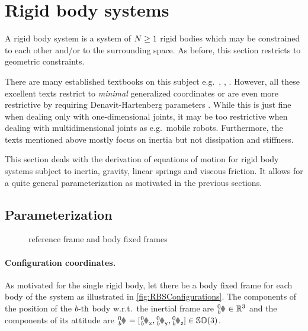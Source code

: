 \section{Rigid body systems}\label{sec:RBSRigidBodySys}
A rigid body system is a system of $N \geq 1$ rigid bodies which may be constrained to each other and/or to the surrounding space.
As before, this section restricts to geometric constraints.

There are many established textbooks on this subject e.g.\ \cite{Schwertassek:MultibodySystems}, \cite{Murray:Robotic}, \cite{Kane:Dynamics}.
However, all these excellent texts restrict to \textit{minimal} generalized coordinates or are even more restrictive by requiring Denavit-Hartenberg parameters \cite{DenavitHartenbergParam}.
While this is just fine when dealing only with one-dimensional joints, it may be too restrictive when dealing with multidimensional joints as e.g.\ mobile robots.
Furthermore, the texts mentioned above mostly focus on inertia but not dissipation and stiffness.

This section deals with the derivation of equations of motion for rigid body systems subject to inertia, gravity, linear springs and viscous friction.
It allows for a quite general parameterization as motivated in the previous sections.

\subsection{Parameterization}\label{sec:RBSParameterization}
\begin{figure}[ht]
 \centering
 
 \caption{reference frame and body fixed frames}
 \label{fig:RBSConfigurations}
\end{figure}

\paragraph{Configuration coordinates.}
As motivated for the single rigid body, let there be a body fixed frame for each body of the system as illustrated in \autoref{fig:RBSConfigurations}.
The components of the position of the $b\text{-th}$ body w.r.t.\ the inertial frame are $\bodyPos{0}{\BidxII} \in \RealNum^3$ and the components of its attitude are $\bodyRot{0}{\BidxII} = [\bodyRotx{0}{\BidxII}, \bodyRoty{0}{\BidxII}, \bodyRotz{0}{\BidxII}] \in \SpecialOrthogonalGroup(3)$.

